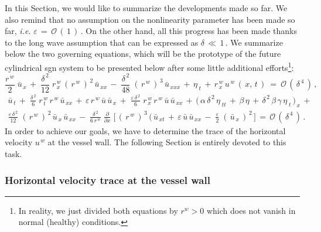 \documentclass[alpha-refs, 12pt]{wiley-article}
\renewcommand{\O}{\mathcal{O}}
\newcommand{\eps}{\varepsilon}
\begin{document}
In this Section, we would like to summarize the developments made so far. We also remind that no assumption on the nonlinearity parameter has been made so far, \emph{i.e.} $\eps\,=\,\O\,(\,1\,)\,$. On the other hand, all this progress has been made thanks to the long wave assumption that can be expressed as $\delta\, \ll \, 1\,$. We summarize below the two governing equations, which will be the prototype of the future cylindrical \acrshort{sgn} system to be presented below after some little additional efforts\footnote{In reality, we just divided both equations by $r^{w} > 0$ which does not vanish in normal (healthy) conditions.}:
\begin{equation}\label{eq:se1}
  \frac{r^{\,w}}{2}\;\bar{u}_{\,x}\,+\;\frac{\delta^{\,2}}{12}\;r^{\,w}_{\,x}\,(\,r^{\,w}\,)^{\,2}\,\bar{u}_{\,xx}\,-\;\frac{\delta^{\,2}}{48}\;(\,r^{\,w}\,)^{\,3}\,\bar{u}_{\,xxx}\,+\,\eta_{\;t}\,+\,r^{\,w}_{\,x}\,u^{\,w}\,(\,x,\,t\,)\ =\ \O\,(\,\delta^{\,4}\,)\,,
\end{equation}
\begin{multline}\label{eq:se2}
   \bar{u}_{\,t}\,+\;\frac{\delta^{\,2}}{6}\;r^{\,w}_{\,t}\,r^{\,w}\,\bar{u}_{\,xx}\,+\,\eps\, r^{\,w}\,\bar{u}\,\bar{u}_{\,x}\,+\;\frac{\eps\,\delta^{\,2}}{6}\;r^{\,w}_{\,x}\,r^{\,w}\,\bar{u}\,\bar{u}_{\,xx}\,+\,\bigl(\,\alpha\,\delta^{\,2}\,\eta_{\;tt}\,+\,\beta\,\eta\, + \,\delta^{\,2}\,\beta\,\gamma\,\eta_{\;t}\,\bigr)_{\,x}\, +\\
   \frac{\eps\,\delta^{\,2}}{12}\;(\,r^{\,w}\,)^{\,2}\,\bar{u}_{\,x}\,\bar{u}_{\,xx}\,-\;\frac{\delta^{\,2}}{6\,r^{\,w}}\;\frac{\partial}{\partial x}\;\biggl[ \,(\,r^{\,w}\,)^{\,3}\,(\,\bar{u}_{\,xt}\,+\,\eps\,\bar{u}\,\bar{u}_{\,xx}\,-\;\frac{\eps}{2}\;(\,\bar{u}_{\,x}\,)^{\,2}\,\biggr]\,=\,\O\,(\,\delta^{\,4}\,)\,.
\end{multline}
In order to achieve our goals, we have to determine the trace of the horizontal velocity $u^{\,w}$ at the vessel wall. The following Section is entirely devoted to this task.

\subsubsection{Horizontal velocity trace at the vessel wall}
\end{document}
